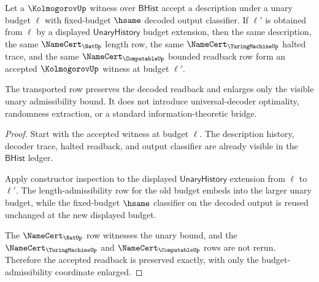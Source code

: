 \begin{theorem}
\label{thm:kolmogorov-budget-monotonicity-obligation}
Let a $\KolmogorovUp$ witness over $\mathsf{BHist}$ accept a description under
a unary budget $\ell$ with fixed-budget $\hsame$ decoded output classifier. If
$\ell'$ is obtained from $\ell$ by a displayed $\mathsf{UnaryHistory}$ budget
extension, then the same description, the same $\NameCert_{\NatUp}$ length
row, the same $\NameCert_{\TuringMachineUp}$ halted trace, and the same
$\NameCert_{\ComputableUp}$ bounded readback row form an accepted
$\KolmogorovUp$ witness at budget $\ell'$.

The transported row preserves the decoded readback and enlarges only the
visible unary admissibility bound. It does not introduce universal-decoder
optimality, randomness extraction, or a standard information-theoretic bridge.
\end{theorem}
\begin{proof}
Start with the accepted witness at budget $\ell$. The description history,
decoder trace, halted readback, and output classifier are already visible in
the $\mathsf{BHist}$ ledger.

Apply constructor inspection to the displayed $\mathsf{UnaryHistory}$ extension
from $\ell$ to $\ell'$. The length-admissibility row for the old budget embeds
into the larger unary budget, while the fixed-budget $\hsame$ classifier on the
decoded output is reused unchanged at the new displayed budget.

The $\NameCert_{\NatUp}$ row witnesses the unary bound, and the
$\NameCert_{\TuringMachineUp}$ and $\NameCert_{\ComputableUp}$ rows are not
rerun. Therefore the accepted readback is preserved exactly, with only the
budget-admissibility coordinate enlarged.
\end{proof}

